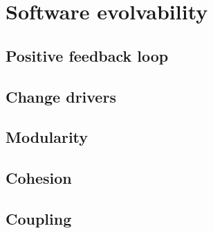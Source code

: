 \section{Software evolvability}
\lipsum[1-1]

\subsection{Positive feedback loop}
\lipsum[1-1]

\subsection{Change drivers}
\lipsum[1-1]

\subsection{Modularity}
\lipsum[1-1]

\subsection{Cohesion}
\lipsum[1-1]

\subsection{Coupling}
\lipsum[1-1]